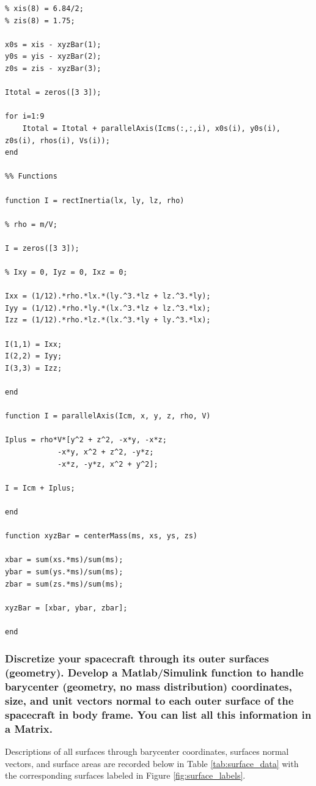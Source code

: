 \begin{lstlisting}
% xis(8) = 6.84/2;
% zis(8) = 1.75;

x0s = xis - xyzBar(1);
y0s = yis - xyzBar(2);
z0s = zis - xyzBar(3);

Itotal = zeros([3 3]);

for i=1:9
    Itotal = Itotal + parallelAxis(Icms(:,:,i), x0s(i), y0s(i), z0s(i), rhos(i), Vs(i));
end

%% Functions

function I = rectInertia(lx, ly, lz, rho)

% rho = m/V;

I = zeros([3 3]);

% Ixy = 0, Iyz = 0, Ixz = 0;

Ixx = (1/12).*rho.*lx.*(ly.^3.*lz + lz.^3.*ly);
Iyy = (1/12).*rho.*ly.*(lx.^3.*lz + lz.^3.*lx);
Izz = (1/12).*rho.*lz.*(lx.^3.*ly + ly.^3.*lx);

I(1,1) = Ixx;
I(2,2) = Iyy;
I(3,3) = Izz;

end

function I = parallelAxis(Icm, x, y, z, rho, V)

Iplus = rho*V*[y^2 + z^2, -x*y, -x*z;
            -x*y, x^2 + z^2, -y*z;
            -x*z, -y*z, x^2 + y^2];

I = Icm + Iplus;

end

function xyzBar = centerMass(ms, xs, ys, zs)

xbar = sum(xs.*ms)/sum(ms);
ybar = sum(ys.*ms)/sum(ms);
zbar = sum(zs.*ms)/sum(ms);

xyzBar = [xbar, ybar, zbar];

end
\end{lstlisting}

\subsubsection{Discretize your spacecraft through its outer surfaces (geometry). Develop a Matlab/Simulink function to handle barycenter (geometry, no mass distribution) coordinates, size, and unit vectors normal to each outer surface of the spacecraft in body frame. You can list all this information in a Matrix. }

Descriptions of all surfaces through barycenter coordinates, surfaces normal vectors, and surface areas are recorded below in Table \ref{tab:surface_data} with the corresponding surfaces labeled in Figure \ref{fig:surface_labels}. 

